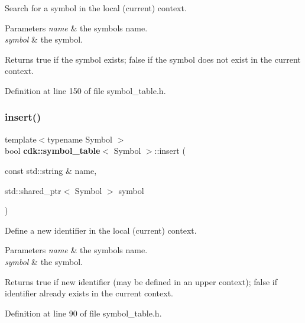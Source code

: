 Search for a symbol in the local (current) context.


\begin{DoxyParams}{Parameters}
{\em name} & the symbol\textquotesingle{}s name. \\
\hline
{\em symbol} & the symbol. \\
\hline
\end{DoxyParams}
\begin{DoxyReturn}{Returns}
{\ttfamily true} if the symbol exists; {\ttfamily false} if the symbol does not exist in the current context. 
\end{DoxyReturn}


Definition at line 150 of file symbol\+\_\+table.\+h.

\mbox{\label{classcdk_1_1symbol__table_ab0d7ace7cea6530192dc426b0d02dca5}} 
\subsubsection{insert()}
{\footnotesize\ttfamily template$<$typename Symbol $>$ \\
bool \textbf{ cdk\+::symbol\+\_\+table}$<$ Symbol $>$\+::insert (\begin{DoxyParamCaption}\item[{const std\+::string \&}]{name,  }\item[{std\+::shared\+\_\+ptr$<$ Symbol $>$}]{symbol }\end{DoxyParamCaption})\hspace{0.3cm}{\ttfamily [inline]}}

Define a new identifier in the local (current) context.


\begin{DoxyParams}{Parameters}
{\em name} & the symbol\textquotesingle{}s name. \\
\hline
{\em symbol} & the symbol. \\
\hline
\end{DoxyParams}
\begin{DoxyReturn}{Returns}
{\ttfamily true} if new identifier (may be defined in an upper context); {\ttfamily false} if identifier already exists in the current context. 
\end{DoxyReturn}


Definition at line 90 of file symbol\+\_\+table.\+h.

\mbox{\label{classcdk_1_1symbol__table_a950073cad906b2f40046f386b70d5a84}} 
